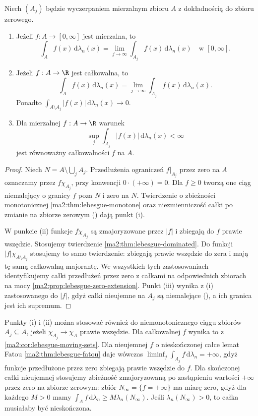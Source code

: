 \begin{twierdzenie}
\label{ma2:thm:improper-exhaustion}
Niech $(A_j)$ będzie wyczerpaniem mierzalnym
zbioru $A$ z dokładnością do zbioru zerowego.
\begin{enumerate}[label=(\roman*)]
\item Jeżeli $f:A\to[0,\infty]$ jest mierzalna, to
\[
 \int_A f(x)\,\mathrm d\lambda_n(x)
 =\lim_{j\to\infty}\int_{A_j}f(x)\,\mathrm d\lambda_n(x)
 \quad\text{w }[0,\infty].
\]
\item Jeżeli $f:A\to\R$ jest całkowalna, to
\[
 \int_A f(x)\,\mathrm d\lambda_n(x)
 =\lim_{j\to\infty}\int_{A_j}f(x)\,\mathrm d\lambda_n(x).
\]
Ponadto
$\int_{A\setminus A_j}|f(x)|\,\mathrm d\lambda_n(x)\to0$.
\item Dla mierzalnej $f:A\to\R$ warunek
\[
 \sup_j\int_{A_j}|f(x)|\,\mathrm d\lambda_n(x)<\infty
\]
jest równoważny całkowalności $f$ na $A$.
\end{enumerate}
\end{twierdzenie}
\begin{proof}
Niech $N=A\setminus\bigcup_j A_j$.
Przedłużenia ograniczeń $f|_{A_j}$ przez zero
na $A$ oznaczamy przez $f\chi_{A_j}$, przy
konwencji $0\cdot(+\infty)=0$.
Dla $f\ge0$ tworzą one ciąg niemalejący
o granicy $f$ poza $N$ i zero na $N$.
Twierdzenie o zbieżności monotonicznej
\ref{ma2:thm:lebesgue-monotone} oraz niezmienniczość
całki po zmianie na zbiorze zerowym
()
dają punkt (i).

W punkcie (ii) funkcje $f\chi_{A_j}$ są
zmajoryzowane przez $|f|$ i zbiegają do $f$
prawie wszędzie. Stosujemy twierdzenie
\ref{ma2:thm:lebesgue-dominated}.
Do funkcji $|f|\chi_{A\setminus A_j}$ stosujemy
to samo twierdzenie: zbiegają prawie wszędzie
do zera i mają tę samą całkowalną majorantę.
We wszystkich tych zastosowaniach identyfikujemy
całki przedłużeń przez zero z całkami na odpowiednich
zbiorach na mocy \ref{ma2:prop:lebesgue-zero-extension}.
Punkt (iii) wynika z (i) zastosowanego do $|f|$,
gdyż całki nieujemne na $A_j$ są niemalejące
(),
a ich granica jest ich supremum.
\end{proof}

Punkty (i) i (ii) można stosować również do
niemonotonicznego ciągu zbiorów $A_j\subseteq A$,
jeżeli $\chi_{A_j}\to\chi_A$ prawie wszędzie.
Dla całkowalnej $f$ wynika to z
\ref{ma2:cor:lebesgue-moving-sets}.
Dla nieujemnej $f$ o nieskończonej całce
lemat Fatou \ref{ma2:thm:lebesgue-fatou} daje wówczas
$\liminf_j\int_{A_j}f\,\mathrm d\lambda_n=+\infty$,
gdyż funkcje przedłużone przez zero
zbiegają prawie wszędzie do $f$.
Dla skończonej całki nieujemnej stosujemy
zbieżność zmajoryzowaną po zastąpieniu wartości
$+\infty$ przez zero na zbiorze zerowym:
zbiór $N_\infty=\{f=+\infty\}$ ma miarę zero,
gdyż dla każdego $M>0$ mamy
$\int_A f\,\mathrm d\lambda_n\ge M\lambda_n(N_\infty)$.
Jeśli $\lambda_n(N_\infty)>0$, to całka
musiałaby być nieskończona.

